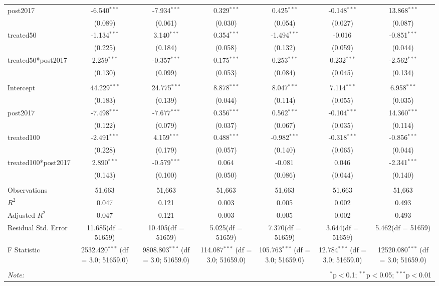 \documentclass[12pt]{article}
\begin{document}
\begin{table}[!htbp]
\begin{tabular}{@{\extracolsep{5pt}}lcccccc}
 post2017 & -6.540$^{***}$ & -7.934$^{***}$ & 0.329$^{***}$ & 0.425$^{***}$ & -0.148$^{***}$ & 13.868$^{***}$ \\
  & (0.089) & (0.061) & (0.030) & (0.054) & (0.027) & (0.087) \\
 treated50 & -1.134$^{***}$ & 3.140$^{***}$ & 0.354$^{***}$ & -1.494$^{***}$ & -0.016$^{}$ & -0.851$^{***}$ \\
  & (0.225) & (0.184) & (0.058) & (0.132) & (0.059) & (0.044) \\
 treated50*post2017 & 2.259$^{***}$ & -0.357$^{***}$ & 0.175$^{***}$ & 0.253$^{***}$ & 0.232$^{***}$ & -2.562$^{***}$ \\
  & (0.130) & (0.099) & (0.053) & (0.084) & (0.045) & (0.134) \\
\hline \\[-1.8ex]
 Intercept & 44.229$^{***}$ & 24.775$^{***}$ & 8.878$^{***}$ & 8.047$^{***}$ & 7.114$^{***}$ & 6.958$^{***}$ \\
  & (0.183) & (0.139) & (0.044) & (0.114) & (0.055) & (0.035) \\
 post2017 & -7.498$^{***}$ & -7.677$^{***}$ & 0.356$^{***}$ & 0.562$^{***}$ & -0.104$^{***}$ & 14.360$^{***}$ \\
  & (0.122) & (0.079) & (0.037) & (0.067) & (0.035) & (0.114) \\
 treated100 & -2.491$^{***}$ & 4.159$^{***}$ & 0.488$^{***}$ & -0.982$^{***}$ & -0.318$^{***}$ & -0.856$^{***}$ \\
  & (0.228) & (0.179) & (0.057) & (0.140) & (0.065) & (0.044) \\
 treated100*post2017 & 2.890$^{***}$ & -0.579$^{***}$ & 0.064$^{}$ & -0.081$^{}$ & 0.046$^{}$ & -2.341$^{***}$ \\
  & (0.143) & (0.100) & (0.050) & (0.086) & (0.044) & (0.140) \\
\hline \\[-1.8ex]
 Observations & 51,663 & 51,663 & 51,663 & 51,663 & 51,663 & 51,663 \\
 $R^2$ & 0.047 & 0.121 & 0.003 & 0.005 & 0.002 & 0.493 \\
 Adjusted $R^2$ & 0.047 & 0.121 & 0.003 & 0.005 & 0.002 & 0.493 \\
 Residual Std. Error & 11.685(df = 51659) & 10.405(df = 51659) & 5.025(df = 51659) & 7.370(df = 51659) & 3.644(df = 51659) & 5.462(df = 51659)  \\
 F Statistic & 2532.420$^{***}$ (df = 3.0; 51659.0) & 9808.803$^{***}$ (df = 3.0; 51659.0) & 114.087$^{***}$ (df = 3.0; 51659.0) & 105.763$^{***}$ (df = 3.0; 51659.0) & 12.784$^{***}$ (df = 3.0; 51659.0) & 12520.080$^{***}$ (df = 3.0; 51659.0) \\
\hline
\hline \\[-1.8ex]
\textit{Note:} & \multicolumn{6}{r}{$^{*}$p$<$0.1; $^{**}$p$<$0.05; $^{***}$p$<$0.01} \\
\end{tabular}
\end{table}
\end{document}
